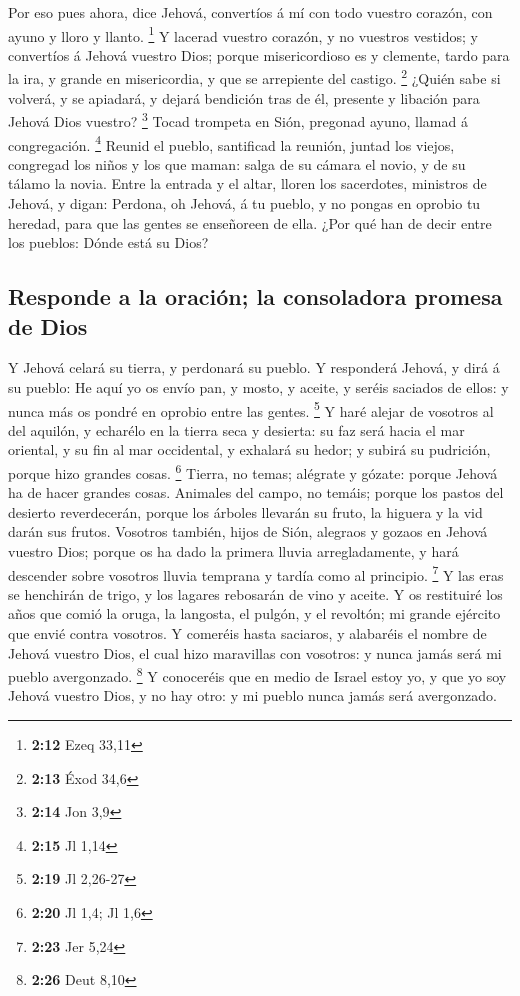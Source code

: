  Por eso pues ahora, dice Jehová, convertíos á mí con
todo vuestro corazón, con ayuno y lloro y llanto. \footnote{\textbf{2:12}
  Ezeq 33,11}  Y lacerad vuestro corazón, y no vuestros
vestidos; y convertíos á Jehová vuestro Dios; porque misericordioso es y
clemente, tardo para la ira, y grande en misericordia, y que se
arrepiente del castigo. \footnote{\textbf{2:13} Éxod 34,6}
 ¿Quién sabe si volverá, y se apiadará, y dejará
bendición tras de él, presente y libación para Jehová Dios vuestro?
\footnote{\textbf{2:14} Jon 3,9}  Tocad trompeta en Sión,
pregonad ayuno, llamad á congregación. \footnote{\textbf{2:15} Jl 1,14}
 Reunid el pueblo, santificad la reunión, juntad los
viejos, congregad los niños y los que maman: salga de su cámara el
novio, y de su tálamo la novia.  Entre la entrada y el
altar, lloren los sacerdotes, ministros de Jehová, y digan: Perdona, oh
Jehová, á tu pueblo, y no pongas en oprobio tu heredad, para que las
gentes se enseñoreen de ella. ¿Por qué han de decir entre los pueblos:
Dónde está su Dios?

\hypertarget{responde-a-la-oraciuxf3n-la-consoladora-promesa-de-dios}{%
\subsection{Responde a la oración; la consoladora promesa de
Dios}\label{responde-a-la-oraciuxf3n-la-consoladora-promesa-de-dios}}

 Y Jehová celará su tierra, y perdonará su pueblo.
 Y responderá Jehová, y dirá á su pueblo: He aquí yo os
envío pan, y mosto, y aceite, y seréis saciados de ellos: y nunca más os
pondré en oprobio entre las gentes. \footnote{\textbf{2:19} Jl 2,26-27}
 Y haré alejar de vosotros al del aquilón, y echarélo en
la tierra seca y desierta: su faz será hacia el mar oriental, y su fin
al mar occidental, y exhalará su hedor; y subirá su pudrición, porque
hizo grandes cosas. \footnote{\textbf{2:20} Jl 1,4; Jl 1,6}
 Tierra, no temas; alégrate y gózate: porque Jehová ha de
hacer grandes cosas.  Animales del campo, no temáis;
porque los pastos del desierto reverdecerán, porque los árboles llevarán
su fruto, la higuera y la vid darán sus frutos.  Vosotros
también, hijos de Sión, alegraos y gozaos en Jehová vuestro Dios; porque
os ha dado la primera lluvia arregladamente, y hará descender sobre
vosotros lluvia temprana y tardía como al principio. \footnote{\textbf{2:23}
  Jer 5,24}  Y las eras se henchirán de trigo, y los
lagares rebosarán de vino y aceite.  Y os restituiré los
años que comió la oruga, la langosta, el pulgón, y el revoltón; mi
grande ejército que envié contra vosotros.  Y comeréis
hasta saciaros, y alabaréis el nombre de Jehová vuestro Dios, el cual
hizo maravillas con vosotros: y nunca jamás será mi pueblo avergonzado.
\footnote{\textbf{2:26} Deut 8,10}  Y conoceréis que en
medio de Israel estoy yo, y que yo soy Jehová vuestro Dios, y no hay
otro: y mi pueblo nunca jamás será avergonzado.

